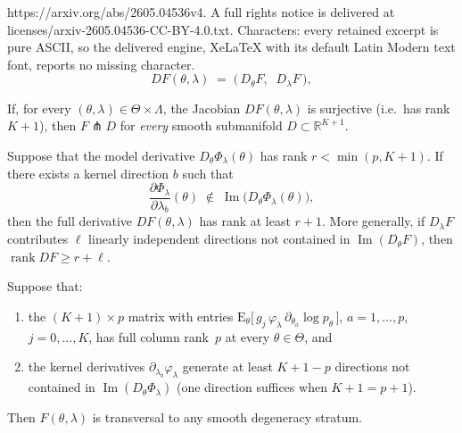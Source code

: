 \documentclass[10pt,a4paper]{amsart}
\newcommand{\E}{\mathrm{E}}
\newcommand{\R}{\mathbb{R}}
\begin{document}
https://arxiv.org/abs/2605.04536v4. A full rights notice is delivered at licenses/arxiv-2605.04536-CC-BY-4.0.txt. Characters: every retained excerpt is pure ASCII, so the delivered engine, XeLaTeX with its default Latin Modern text font, reports no missing character.
\begin{equation}\label{eq:DF_decomposition}
  DF(\theta,\lambda)\;=\;
  \bigl(\,D_\theta F,\;\; D_\lambda F\,\bigr),
\end{equation}

\begin{theorem}
\label{thm:submersivity}
If, for every $(\theta,\lambda)\in\Theta\times\Lambda$, the Jacobian
$DF(\theta,\lambda)$ is surjective (i.e.\ has rank~$K+1$), then
$F\pitchfork D$ for \emph{every} smooth submanifold
$D\subset\R^{K+1}$.
\end{theorem}

\begin{proposition}
\label{prop:kernel_rank}
Suppose that the model derivative $D_\theta\Phi_\lambda(\theta)$ has
rank $r < \min(p, K\!+\!1)$.  If there exists a kernel direction
$b$ such that
\[
  \frac{\partial \Phi_\lambda}{\partial \lambda_b}(\theta)
  \;\notin\;
  \operatorname{Im}\bigl(D_\theta\Phi_\lambda(\theta)\bigr),
\]
then the full derivative $DF(\theta,\lambda)$ has rank at least
$r+1$.  More generally, if $D_\lambda F$ contributes $\ell$ linearly
independent directions not contained in
$\operatorname{Im}(D_\theta F)$, then
$\operatorname{rank} DF \geq r + \ell$.
\end{proposition}

\begin{proposition}
\label{prop:graphical_transversality}
Suppose that:
\begin{enumerate}[label=\textnormal{(\alph*)}]
\item the $(K\!+\!1)\times p$ matrix with entries
  $\E_\theta\bigl[\,g_j\,\varphi_\lambda\,
  \partial_{\theta_a}\log p_\theta\,\bigr]$,
  $a = 1,\ldots,p$, $j = 0,\ldots,K$, has full column rank~$p$ at
  every $\theta\in\Theta$, and
\item the kernel derivatives
  $\partial_{\lambda_b}\varphi_\lambda$ generate at least
  $K\!+\!1-p$ directions not contained in
  $\operatorname{Im}(D_\theta\Phi_\lambda)$
  (one direction suffices when $K\!+\!1 = p\!+\!1$).
\end{enumerate}
Then $F(\theta,\lambda)$ is transversal to any smooth degeneracy
stratum.
\end{proposition}
\end{document}
